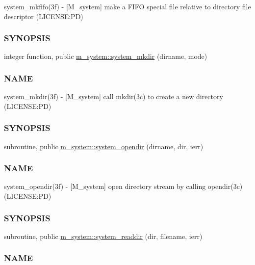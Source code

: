 \begin{DoxyCompactItemize}
\begin{DoxyCompactList}
system\+\_\+mkfifo(3f) -\/ \mbox{[}M\+\_\+system\mbox{]} make a F\+I\+FO special file relative to directory file descriptor (L\+I\+C\+E\+N\+SE\+:PD) \subsubsection*{S\+Y\+N\+O\+P\+S\+IS}\end{DoxyCompactList}\item 
integer function, public \mbox{\hyperlink{namespacem__system_a084d644c236d22af2cc75c6e48fd6e96}{m\+\_\+system\+::system\+\_\+mkdir}} (dirname, mode)
\begin{DoxyCompactList}\small\item\em \subsubsection*{N\+A\+ME}

system\+\_\+mkdir(3f) -\/ \mbox{[}M\+\_\+system\mbox{]} call mkdir(3c) to create a new directory (L\+I\+C\+E\+N\+SE\+:PD) \subsubsection*{S\+Y\+N\+O\+P\+S\+IS}\end{DoxyCompactList}\item 
subroutine, public \mbox{\hyperlink{namespacem__system_a622cc67c03e8cdea1d4c2430bb36081b}{m\+\_\+system\+::system\+\_\+opendir}} (dirname, dir, ierr)
\begin{DoxyCompactList}\small\item\em \subsubsection*{N\+A\+ME}

system\+\_\+opendir(3f) -\/ \mbox{[}M\+\_\+system\mbox{]} open directory stream by calling opendir(3c) (L\+I\+C\+E\+N\+SE\+:PD) \subsubsection*{S\+Y\+N\+O\+P\+S\+IS}\end{DoxyCompactList}\item 
subroutine, public \mbox{\hyperlink{namespacem__system_a983df5b2d7cb5842d69c4a31829403e0}{m\+\_\+system\+::system\+\_\+readdir}} (dir, filename, ierr)
\begin{DoxyCompactList}\small\item\em \subsubsection*{N\+A\+ME}


\end{DoxyCompactList}
\end{DoxyCompactItemize}
